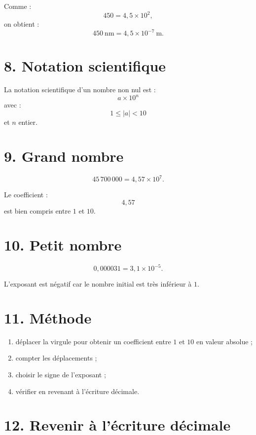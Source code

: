 Comme :
\[
450=4{,}5\times10^2,
\]
on obtient :
\[
450\ \text{nm}=4{,}5\times10^{-7}\ \text{m}.
\]

\section{8. Notation scientifique}


\begin{definition}
La notation scientifique d'un nombre non nul est :
\[
\boxed{a\times10^n}
\]
avec :
\[
1\le |a|<10
\]
et $n$ entier.
\end{definition}

\section{9. Grand nombre}

\[
45\,700\,000
=
4{,}57\times10^7.
\]

Le coefficient :
\[
4{,}57
\]
est bien compris entre $1$ et $10$.

\section{10. Petit nombre}

\[
0{,}000031
=
3{,}1\times10^{-5}.
\]

L'exposant est négatif car le nombre initial est très inférieur à $1$.

\section{11. Méthode}

\begin{methode}
\begin{enumerate}
\item déplacer la virgule pour obtenir un coefficient entre $1$ et $10$ en valeur absolue ;
\item compter les déplacements ;
\item choisir le signe de l'exposant ;
\item vérifier en revenant à l'écriture décimale.
\end{enumerate}
\end{methode}

\section{12. Revenir à l'écriture décimale}

